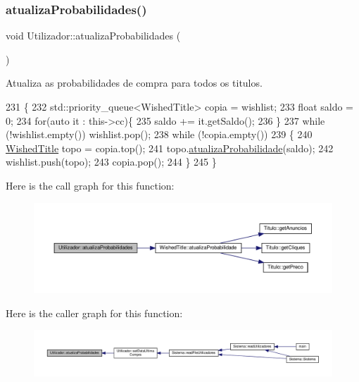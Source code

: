 \subsubsection{\texorpdfstring{atualiza\+Probabilidades()}{atualizaProbabilidades()}}
{\footnotesize\ttfamily void Utilizador\+::atualiza\+Probabilidades (\begin{DoxyParamCaption}{ }\end{DoxyParamCaption})}



Atualiza as probabilidades de compra para todos os titulos. 


\begin{DoxyCode}
231                                        \{
232     std::priority\_queue<WishedTitle> copia = wishlist;
233     \textcolor{keywordtype}{float} saldo = 0;
234     \textcolor{keywordflow}{for}(\textcolor{keyword}{auto} it : this->cc)\{
235         saldo += it.getSaldo();
236     \}
237     \textcolor{keywordflow}{while} (!wishlist.empty()) wishlist.pop();
238     \textcolor{keywordflow}{while} (!copia.empty())
239     \{
240         \hyperlink{classWishedTitle}{WishedTitle} topo = copia.top();
241         topo.\hyperlink{classWishedTitle_a8be5446371add65ba4de2c69c84cb387}{atualizaProbabilidade}(saldo);
242         wishlist.push(topo);
243         copia.pop();
244     \}
245 \}
\end{DoxyCode}
Here is the call graph for this function\+:
\nopagebreak
\begin{figure}[H]
\begin{center}
\leavevmode
\includegraphics[width=350pt]{classUtilizador_a82b216e27c9716cce49a7b98d59445cb_cgraph}
\end{center}
\end{figure}
Here is the caller graph for this function\+:
\nopagebreak
\begin{figure}[H]
\begin{center}
\leavevmode
\includegraphics[width=350pt]{classUtilizador_a82b216e27c9716cce49a7b98d59445cb_icgraph}
\end{center}
\end{figure}
\mbox{\label{classUtilizador_a6a128859b776bf019b5652ce61f62280}} 
